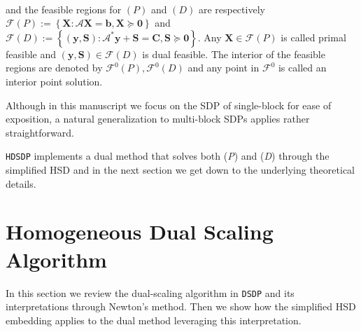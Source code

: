 \documentclass[10pt]{article}
\begin{document}
{{{}\\

and the feasible regions for $(P)$ and $(D)$ are respectively
$\mathcal{F} (P) := \left\{ \mathbf{X} : \mathcal{A} \mathbf{X} = \mathbf{b}, \mathbf{X} \succeq \textbf{0} \right\}$
and $\mathcal{F} (D) := \left\{ \left( \mathbf{y}, \mathbf{S} \right) : \mathcal{A}^{\ast} \mathbf{y} +
\mathbf{S} = \mathbf{C}, \mathbf{S} \succeq \textbf{0} \right\}$. Any $\mathbf{X} \in \mathcal{F} (P)$ is called primal
feasible and $\left( \mathbf{y}, \mathbf{S} \right) \in \mathcal{F} (D)$ is dual feasible.
The interior of the feasible regions are denoted by $\mathcal{F}^0 (P),
\mathcal{F}^0 (D)$ and any point in $\mathcal{F}^0$ is called an interior
point solution. 

\begin{remark}
  Although in this manuscript we focus on the SDP of single-block for ease of
  exposition, a natural generalization to multi-block SDPs applies rather
  straightforward.
\end{remark}

{{\texttt{HDSDP}}} implements a dual method that solves both
({{\em P\/}}) and ({{\em D\/}}) through the simplified HSD and in the next
section we get down to the underlying theoretical details.


\section{Homogeneous Dual Scaling Algorithm }\label{sec3}

In this section we review the dual-scaling algorithm in
{{\texttt{DSDP}}} and its interpretations through Newton's method. Then
we show how the simplified HSD embedding applies to the dual method leveraging 
this interpretation.

}}
\end{document}
